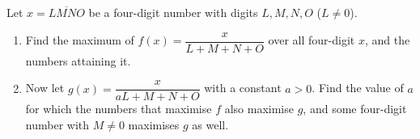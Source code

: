 Let $x=\overline{LMNO}$ be a four-digit number with digits $L,M,N,O$ ($L\ne0$).
\begin{enumerate}
\item[(a)] Find the maximum of $f(x)=\dfrac x{L+M+N+O}$ over all four-digit $x$, and the numbers attaining it.
\item[(b)] Now let $g(x)=\dfrac x{aL+M+N+O}$ with a constant $a>0$. Find the value of $a$ for which the numbers that maximise $f$ also maximise $g$, and some four-digit number with $M\ne0$ maximises $g$ as well.
\end{enumerate}
